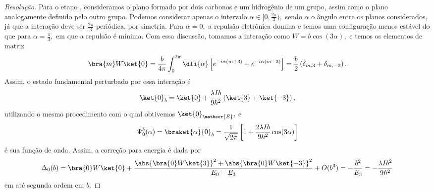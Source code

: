\begin{proof}[Resolução]
   Para o etano , consideramos o plano formado por dois carbonos e um hidrogênio de um grupo, assim como o plano analogamente definido pelo outro grupo. Podemos considerar apenas o intervalo \(\alpha \in [0,\frac{2\pi}{3}),\) sendo \(\alpha\) o ângulo entre os planos considerados, já que a interação deve ser \(\frac{2\pi}{3}\)-periódica, por simetria. Para \(\alpha = 0,\) a repulsão eletrônica domina e temos uma configuração menos estável do que para \(\alpha = \frac{\pi}{3},\) em que a repulsão é mínima. Com essa discussão, tomamos a interação como \(W = b \cos(3\alpha),\) e temos os elementos de matriz
   \begin{equation*}
      \bra{m}W\ket{0} = \frac{b}{4\pi} \int_0^{2\pi} \dli{\alpha} \left[e^{-i\alpha (m + 3)} + e^{-i\alpha(m-3)}\right] = \frac{b}{2} \left(\delta_{m,3} + \delta_{m,-3}\right).
   \end{equation*}
   Assim, o estado fundamental perturbado por essa interação é
   \begin{equation*}
      \ket{0}_b = \ket{0} + \frac{\lambda I b}{9\hbar^2} \left(\ket{3} + \ket{-3}\right),
   \end{equation*}
   utilizando o mesmo procedimento com o qual obtivemos \(\ket{0}_\mathscr{E},\) e
   \begin{equation*}
      \Psi_0^b(\alpha) = \braket{\alpha}{0}_b = \frac{1}{\sqrt{2\pi}}\left[1 + \frac{2\lambda I b}{9\hbar^2}\cos(3\alpha)\right]
   \end{equation*}
   é sua função de onda. Assim, a correção para energia é dada por
   \begin{equation*}
      \Delta_0(b) = \bra{0}W\ket{0} + \frac{\abs{\bra{0}W\ket{3}}^2 + \abs{\bra{0}W\ket{-3}}^2}{E_0 - E_3} + O(b^3) 
                  = -\frac{b^2}{E_3}
                  = -\frac{\lambda I b^2}{9\hbar^2}
   \end{equation*}
   em até segunda ordem em \(b.\)
\end{proof}
